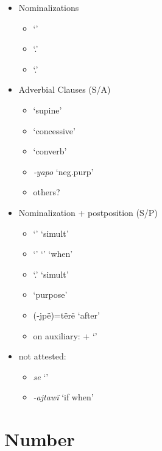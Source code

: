 \documentclass{memoir}
\begin{document}
\begin{itemize}
\tightlist
\item
  Nominalizations

  \begin{itemize}
  \tightlist
  \item
     `'
  \item
     `.'
  \item
     `.'
  \end{itemize}
\item
  Adverbial Clauses (S/A)

  \begin{itemize}
  \tightlist
  \item
     `supine'
  \item
     `concessive'
  \item
     `converb'
  \item
    \emph{‑yapo} `neg.purp'
  \item
    others?
  \end{itemize}
\item
  Nominalization + postposition (S/P)

  \begin{itemize}
  \tightlist
  \item
     `' `simult'
  \item
     `'  `' `when'
  \item
     `.' `simult'
  \item
     `purpose'
  \item
    (‑jpë)=tërë `after'
  \item
    on auxiliary:  +  `'
  \end{itemize}
\item
  not attested:

  \begin{itemize}
  \tightlist
  \item
    \emph{se} `'
  \item
    \emph{-ajtawï} `if when'
  \end{itemize}
\end{itemize}

\section{Number}
\end{document}
